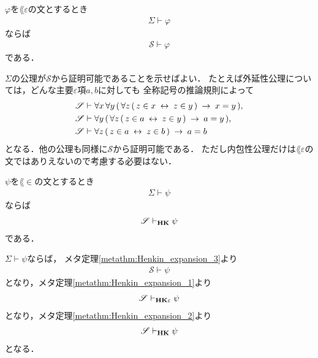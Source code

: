 	\begin{screen}
		\begin{metathm}
		\label{metathm:Henkin_expansion_3}
			$\varphi$を$\lang{\varepsilon}$の文とするとき
			\begin{align}
				\Sigma \vdash \varphi
			\end{align}
			ならば
			\begin{align}
				\mathscr{S} \vdash \varphi
			\end{align}
			である．
		\end{metathm}
	\end{screen}
	
	\begin{sketch}
		$\Sigma$の公理が$\mathscr{S}$から証明可能であることを示せばよい．
		たとえば外延性公理については，どんな主要$\varepsilon$項$a,b$に対しても
		全称記号の推論規則によって
		\begin{align}
			\mathscr{S} &\vdash \forall x\, \forall y\, (\, \forall z\, 
				(\, z \in x \hspace{0.25em}\leftrightarrow\hspace{0.25em} z \in y\, ) \hspace{0.25em}\rightarrow\hspace{0.25em} x = y\, ), \\
			\mathscr{S} &\vdash \forall y\, (\, \forall z\, 
				(\, z \in a \hspace{0.25em}\leftrightarrow\hspace{0.25em} z \in y\, ) \hspace{0.25em}\rightarrow\hspace{0.25em} a = y\, ), \\
			\mathscr{S} &\vdash \forall z\, 
				(\, z \in a \hspace{0.25em}\leftrightarrow\hspace{0.25em} z \in b\, ) \hspace{0.25em}\rightarrow\hspace{0.25em} a = b
		\end{align}
		となる．他の公理も同様に$\mathscr{S}$から証明可能である．
		ただし内包性公理だけは$\lang{\varepsilon}$の文ではありえないので考慮する必要はない．
		\QED
	\end{sketch}
	
	\begin{screen}
		\begin{metathm}
			$\psi$を$\lang{\in}$の文とするとき
			\begin{align}
				\Sigma \vdash \psi
			\end{align}
			ならば
			\begin{align}
				\mathscr{S} \vdash_{{\scriptsize \mbox{{\bf HK}}}} \psi
			\end{align}
			である．
		\end{metathm}
	\end{screen}
	
	\begin{sketch}
		$\Sigma \vdash \psi$ならば，
		メタ定理\ref{metathm:Henkin_expansion_3}より
		\begin{align}
			\mathscr{S} \vdash \psi
		\end{align}
		となり，メタ定理\ref{metathm:Henkin_expansion_1}より
		\begin{align}
			\mathscr{S} \vdash_{{\scriptsize \mbox{{\bf HK$\varepsilon$}}}} \psi
		\end{align}
		となり，メタ定理\ref{metathm:Henkin_expansion_2}より
		\begin{align}
			\mathscr{S} \vdash_{{\scriptsize \mbox{{\bf HK}}}} \psi
		\end{align}
		となる．
		\QED
	\end{sketch}